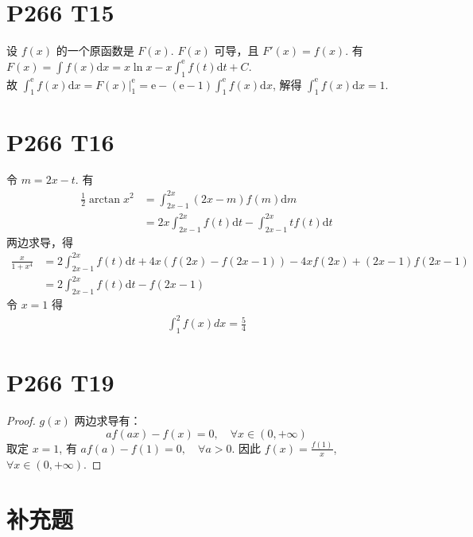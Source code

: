 \documentclass{article}
\newcommand{\dd}{\mathrm{d}}
\newcommand{\dx}{\dd x}
\newcommand{\dt}{\dd t}
\newcommand{\ee}{\mathrm{e}}
\begin{document}
\section*{P266 T15}

设 $f(x)$ 的一个原函数是 $F(x)$. $F(x)$ 可导，且 $F'(x) = f(x)$. 有 $F(x) = \int f(x) \dx = x \ln x - x\int_{1}^{\ee}f(t)\dt + C$. \\
故 $\int_{1}^{\ee}f(x)\dx = F(x)\bigg|_1^\ee = \ee - (\ee - 1)\int_{1}^{\ee}f(x)\dx$, 解得 $\int_{1}^{\ee}f(x)\dx = 1$.

\section*{P266 T16}

令 $m = 2x - t$. 有
\begin{align*}
    \frac{1}{2}\arctan x^2 &= \int_{2x - 1}^{2x}(2x - m)f(m)\dd m \\
    &= 2x \int_{2x - 1}^{2x}f(t)\dt - \int_{2x - 1}^{2x}tf(t)\dt
\end{align*}
两边求导，得
\begin{align*}
    \frac{x}{1 + x^4} &= 2\int_{2x - 1}^{2x}f(t)\dt + 4x\left(f(2x) - f(2x - 1)\right) - 4xf(2x) + (2x - 1)f(2x - 1) \\
    &= 2\int_{2x - 1}^{2x}f(t)\dt - f(2x - 1)
\end{align*}
令 $x = 1$ 得
\begin{align*}
    \int_{1}^{2}f(x)dx = \frac{5}{4}
\end{align*}

\section*{P266 T19}  

\begin{proof}
    $g(x)$ 两边求导有：
    \[
        af(ax) - f(x) = 0, \quad \forall x \in (0, +\infty)
    \]
    取定 $x = 1$, 有 $af(a) - f(1) = 0, \quad \forall a > 0$. 因此 $f(x) = \frac{f(1)}{x}$, $\forall x \in (0, +\infty)$.
\end{proof}

\section*{补充题}
\end{document}
